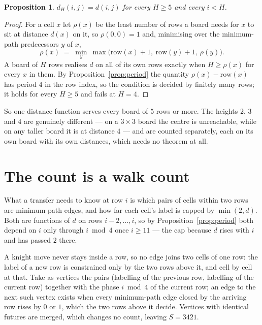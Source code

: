 \documentclass[11pt,a4paper]{article}
\theoremstyle{plain}
\newtheorem{proposition}[theorem]{Proposition}
\theoremstyle{definition}
\begin{document}
\begin{proposition}\label{prop:height}
$d_H(i,j)=d(i,j)$ for every $H\ge5$ and every $i<H$.
\end{proposition}

\begin{proof}
For a cell $x$ let $\rho(x)$ be the least number of rows a board needs for $x$ to sit at distance $d(x)$ on it, so $\rho(0,0)=1$ and, minimising over the minimum-path predecessors $y$ of $x$,
\[ \rho(x)\;=\;\min_y\ \max\bigl(\mathrm{row}(x)+1,\ \mathrm{row}(y)+1,\ \rho(y)\bigr). \]
A board of $H$ rows realises $d$ on all of its own rows exactly when $H\ge\rho(x)$ for every $x$ in them. By Proposition~\ref{prop:period} the quantity $\rho(x)-\mathrm{row}(x)$ has period $4$ in the row index, so the condition is decided by finitely many rows; it holds for every $H\ge5$ and fails at $H=4$.
\end{proof}

So one distance function serves every board of $5$ rows or more. The heights 2, 3 and 4 are genuinely different --- on a $3\times3$ board the centre is unreachable, while on any taller board it is at distance $4$ --- and are counted separately, each on its own board with its own distances, which needs no theorem at all.

\section{The count is a walk count}

What a transfer needs to know at row $i$ is which pairs of cells within two rows are minimum-path edges, and how far each cell's label is capped by $\min(2,d)$. Both are functions of $d$ on rows $i-2,\dots,i$, so by Proposition~\ref{prop:period} both depend on $i$ only through $i\bmod 4$ once $i\ge11$ --- the cap because $d$ rises with $i$ and has passed $2$ there.

A knight move never stays inside a row, so no edge joins two cells of one row: the label of a new row is constrained only by the two rows above it, and cell by cell at that. Take as vertices the pairs (labelling of the previous row, labelling of the current row) together with the phase $i\bmod 4$ of the current row; an edge to the next such vertex exists when every minimum-path edge closed by the arriving row rises by $0$ or $1$, which the two rows above it decide. Vertices with identical futures are merged, which changes no count, leaving $S=3421$.
\end{document}
